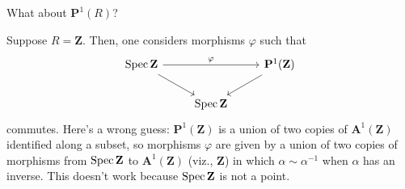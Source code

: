 \documentclass [11 pt, oneside] {article}
\begin{document}
\begin{problem}
	What about $\mathbf{P}^1(R)$?
\end{problem}

\begin{example}[ ]\label{}\text{}
Suppose $R=\mathbf{Z}$. Then, one considers morphisms $\varphi$ such that
\[
\begin{tikzcd}
	\Spec \mathbf{Z} \ar[rd]\ar[rr,"\varphi"] &&\mathbf{P}^1(\mathbf{Z})\ar[ld]\\
						  &\Spec \mathbf{Z}
\end{tikzcd}
\]
commutes.
Here's a wrong guess: $\mathbf{P}^1(\mathbf{Z})$ is a union of two copies of $\mathbf{A}^1(\mathbf{Z})$ identified along a subset, so morphisms $\varphi$ are given by a union of two copies of morphisms from $\operatorname{Spec} \mathbf{Z}$ to $\mathbf{A}^1(\mathbf{Z})$ (viz., $\mathbf{Z}$) in which $\alpha\sim \alpha^{-1}$ when $\alpha$ has an inverse. This doesn't work because $\operatorname{Spec} \mathbf{Z}$ is not a point.


\end{example}
\end{document}
